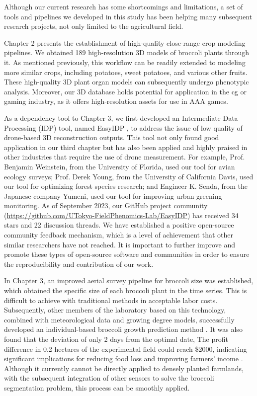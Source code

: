   Although our current research has some shortcomings and limitations, 
  a set of tools and pipelines we developed in this study has been helping many subsequent research projects, 
  not only limited to the agricultural field.

  Chapter 2 presents the establishment of high-quality close-range crop modeling pipelines.
  We obtained 189 high-resolution 3D models of broccoli plants through it. 
  As mentioned previously, this workflow can be readily extended to modeling more similar crops, including potatoes, sweet potatoes, and various other fruits.
  These high-quality 3D plant organ models can subsequently undergo phenotypic analysis. 
  Moreover, our 3D database holds potential for application in the \gls{cg} or gaming industry, as it offers high-resolution assets for use in AAA games.



  As a dependency tool to Chapter 3, 
  we first developed an Intermediate Data Processing (IDP) tool, named EasyIDP \mbox{\citep{wang_easyidp_2021}}, 
  to address the issue of low quality of drone-based 3D reconstruction outputs. 
  This tool not only found good application in our third chapter but has also been applied and highly praised in other industries that require the use of drone measurement. 
  For example, Prof. Benjamin Weinstein, from the University of Florida, used our tool for avian ecology surveys; 
  Prof. Derek Young, from the University of California Davis, used our tool for optimizing forest species research; and
  Engineer K. Senda, from the Japanese company Yumeni, used our tool for improving urban greening monitoring. 
  As of September 2023, our GitHub project community (\url{https://github.com/UTokyo-FieldPhenomics-Lab/EasyIDP}) has received 34 stars and 22 discussion threads. 
  We have established a positive open-source community feedback mechanism,
  which is a level of achievement that other similar researchers have not reached. 
  It is important to further improve and promote these types of open-source software and communities in order to ensure the reproducibility and contribution of our work.



  In Chapter 3, an improved aerial survey pipeline for broccoli size was established, 
  which obtained the specific size of each broccoli plant in the time series. 
  This is difficult to achieve with traditional methods in acceptable labor costs. 
  Subsequently, other members of the laboratory based on this technology, combined with meteorological data and growing degree models, 
  successfully developed an individual-based broccoli growth prediction method \mbox{\citep{wang_drone-based_2023}}. 
  It was also found that the deviation of only 2 days from the optimal date, 
  The profit difference in 0.2 hectares of the experimental field could reach \$2000, 
  indicating significant implications for reducing food loss and improving farmers' income \mbox{\citep{wang_drone-based_2023}}. 
  Although it currently cannot be directly applied to densely planted farmlands, with the subsequent integration of other sensors to solve the broccoli segmentation problem, this process can be smoothly applied.



